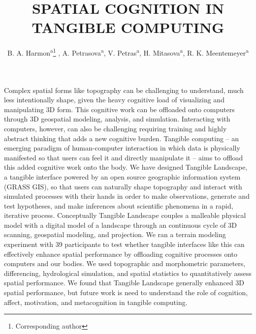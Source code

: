 \documentclass{isprs}
\begin{document}
\title{SPATIAL COGNITION IN TANGIBLE COMPUTING}

\author{
 B. A. Harmon\textsuperscript{a}\thanks{Corresponding author}
 , A. Petrasova\textsuperscript{a}, V. Petras\textsuperscript{a}, H. Mitasova\textsuperscript{a}, R. K. Meentemeyer\textsuperscript{a}}

\address
{
	\textsuperscript{a }Center for Geospatial Analytics, North Carolina State University - (baharmon, akratoc, vpetras, hmitaso, rkmeente)@ncsu.edu\\
}

\commission{}{} %
\workinggroup{} %
\icwg{}   %

\abstract
{
Complex spatial forms like topography can be challenging to understand, much less intentionally shape, given the heavy cognitive load of visualizing and manipulating 3D form. 
This cognitive work can be offloaded onto computers through 3D geospatial modeling, analysis, and simulation.
Interacting with computers, however, can also be challenging 
requiring training and highly abstract thinking that adds a new cognitive burden. 
Tangible computing -- an emerging paradigm of human-computer interaction in which data is physically manifested so that users can feel it and directly manipulate it -- aims to offload this added cognitive work onto the body. 
We have designed Tangible Landscape, a tangible interface powered by an open source geographic information system (GRASS GIS), 
so that users can naturally shape topography and interact with simulated processes with their hands 
in order to make observations, generate and test hypotheses, and make inferences about scientific phenomena
in a rapid, iterative process. 
Conceptually Tangible Landscape couples a malleable physical model with a digital model of a landscape through an continuous cycle of 3D scanning, geospatial modeling, and projection. 
We ran a terrain modeling experiment with 39 participants to test whether tangible interfaces like this can effectively enhance spatial performance by offloading cognitive processes onto computers and our bodies.  We used topographic and morphometric parameters, differencing, hydrological simulation, and spatial statistics to quantitatively assess spatial performance. 
We found that Tangible Landscape generally enhanced 3D spatial performance, but future work is need to understand the role of cognition, affect, motivation, and metacognition in tangible computing. 
}
\end{document}
